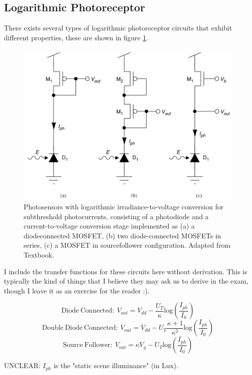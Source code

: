 \subsection{Logarithmic Photoreceptor}

There exists several types of logarithmic photoreceptor circuits that exhibit different properties, these are shown in figure \ref{fig:Log_Photoreceptors}. 

\begin{figure}[H]
    \centering
    \includegraphics[width=0.5\linewidth]{../../Figures/Log_Photoreceptors.PNG}
    \caption{Photosensors with logarithmic irradiance-to-voltage conversion for subthreshold photocurrents, consisting of a photodiode and a current-to-voltage conversion stage implemented as (a) a diodeconnected MOSFET, (b) two diode-connected MOSFETs in series, (c) a MOSFET in sourcefollower configuration. Adapted from Textbook.}
    \label{fig:Log_Photoreceptors}
\end{figure}

I include the transfer functions for these circuits here without derivation. This is typically the kind of things that I believe they may ask us to derive in the exam, though I leave it as an exercise for the reader :). 

\begin{equation}
    \mathrm{Diode \ Connected:}\ V_{out} = V_{dd} - \frac{U_T}{\kappa}\mathrm{log}(\frac{I_{ph}}{I_0})
\end{equation}
\begin{equation}
    \mathrm{Double \ Diode \ Connected:}\ V_{out} = V_{dd} - U_T\frac{\kappa + 1}{\kappa ^2}\mathrm{log}(\frac{I_{ph}}{I_0})
\end{equation}
\begin{equation}
    \mathrm{Source \ Follower:}\ V_{out} = \kappa V_g - U_T\mathrm{log}(\frac{I_{ph}}{I_0})
\end{equation}

UNCLEAR: $I_{ph}$ is the "static scene illuminance" (in Lux).   

